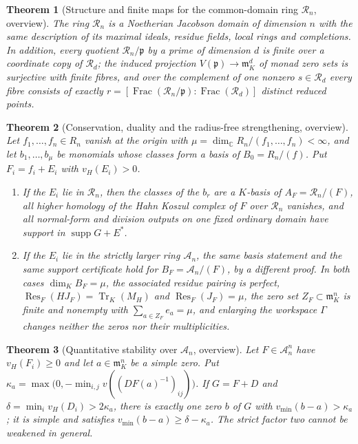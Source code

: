 \documentclass[11pt,letterpaper]{article}
\newtheorem{theorem}{Theorem}[section]
\theoremstyle{definition}
\theoremstyle{remark}
\newcommand{\C}{\mathbb C}
\newcommand{\A}{\mathscr A}
\newcommand{\RR}{\mathscr R}
\newcommand{\m}{\mathfrak m}
\newcommand{\pp}{\mathfrak p}
\newcommand{\Res}{\operatorname{Res}}
\newcommand{\supp}{\operatorname{supp}}
\newcommand{\Tr}{\operatorname{Tr}}
\newcommand{\Frac}{\operatorname{Frac}}
\newcommand{\vH}{v_{\!H}}
\newcommand{\vmin}{v_{\min}}
\numberwithin{equation}{section}
\begin{document}
\begin{theorem}[Structure and finite maps for the common-domain ring
$\RR_n$, overview]\label{analytic:thm:overview-structure-R}
The ring $\RR_n$ is a Noetherian Jacobson domain of dimension $n$ with the
same description of its maximal ideals, residue fields, local rings and
completions. In addition, every quotient $\RR_n/\pp$ by a prime of
dimension $d$ is finite over a coordinate copy of $\RR_d$; the induced
projection $V(\pp)\to\m_K^d$ of monad zero sets is surjective with finite
fibres, and over the complement of one nonzero $s\in\RR_d$ every fibre
consists of exactly $r=[\Frac(\RR_n/\pp):\Frac(\RR_d)]$ distinct reduced
points.
\end{theorem}

\begin{theorem}[Conservation, duality and the radius-free strengthening,
overview]\label{analytic:thm:overview-deform}
Let $f_1,\ldots,f_n\in R_n$ vanish at the origin with
$\mu=\dim_\C R_n/(f_1,\ldots,f_n)<\infty$, and let $b_1,\ldots,b_\mu$ be
monomials whose classes form a basis of $B_0=R_n/(f)$. Put $F_i=f_i+E_i$
with $\vH(E_i)>0$.
\begin{enumerate}
\item If the $E_i$ lie in $\RR_n$, then the classes of the $b_r$ are a
$K$-basis of $A_F=\RR_n/(F)$, all higher homology of the Hahn Koszul complex
of $F$ over $\RR_n$ vanishes, and all normal-form and division outputs on
one fixed ordinary domain have support in $\supp G+E^*$.
\item If the $E_i$ lie in the strictly larger ring $\A_n$, the same basis
statement and the same support certificate hold for
$B_F=\A_n/(F)$, by a different proof. In both cases $\dim_KB_F=\mu$, the
associated residue pairing is perfect, $\Res_F(HJ_F)=\Tr_K(M_H)$ and
$\Res_F(J_F)=\mu$, the zero set $Z_F\subset\m_K^n$ is finite and nonempty
with $\sum_{a\in Z_F}e_a=\mu$, and enlarging the workspace $\Gamma$ changes
neither the zeros nor their multiplicities.
\end{enumerate}
\end{theorem}

\begin{theorem}[Quantitative stability over $\A_n$, overview]
\label{analytic:thm:overview-stability}
Let $F\in\A_n^n$ have $\vH(F_i)\ge0$ and let $a\in\m_K^n$ be a simple zero.
Put $\kappa_a=\max\bigl(0,-\min_{i,j}v((DF(a)^{-1})_{ij})\bigr)$. If $G=F+D$
and $\delta=\min_i\vH(D_i)>2\kappa_a$, there is exactly one zero $b$ of $G$
with $\vmin(b-a)>\kappa_a$; it is simple and satisfies
$\vmin(b-a)\ge\delta-\kappa_a$. The strict factor two cannot be weakened in general.
\end{theorem}
\end{document}
